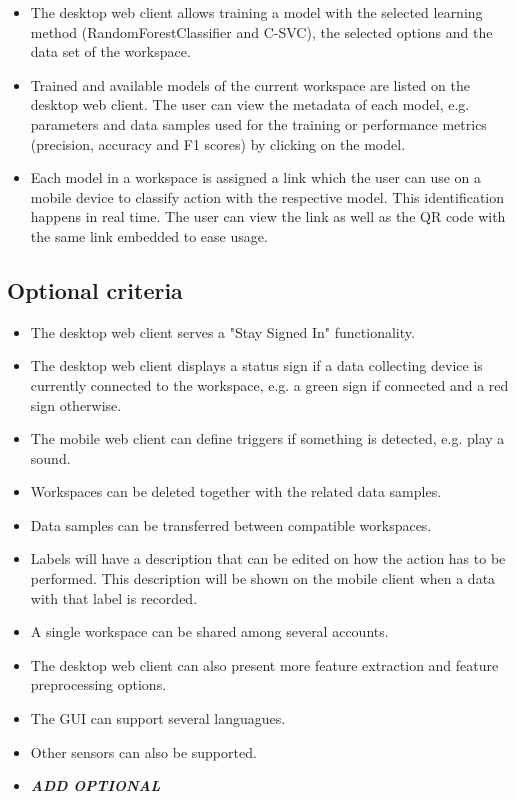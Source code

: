 \begin{itemize}
    \item The desktop web client allows training a model with the selected learning method (RandomForestClassifier and C-SVC), the selected options and the data set of the workspace.
    \item Trained and available models of the current workspace are listed on the desktop web client. The user can view the metadata of each model, e.g. parameters and data samples used for the training or performance metrics (precision, accuracy and F1 scores) by clicking on the model.
    \item Each model in a workspace is assigned a link which the user can use on a mobile device to classify action with the respective model. This identification happens in real time. The user can view the link as well as the QR code with the same link embedded to ease usage.
\end{itemize}

\subsection{Optional criteria}
\begin{itemize}
    \item The desktop web client serves a "Stay Signed In" functionality.
    \item The desktop web client displays a status sign if a data collecting device is currently connected to the workspace, e.g. a green sign if connected and a red sign otherwise.
    \item The mobile web client can define triggers if something is detected, e.g. play a sound.
    \item Workspaces can be deleted together with the related data samples.
    \item Data samples can be transferred between compatible workspaces.
    \item Labels will have a description that can be edited on how the action has to be performed. This description will be shown on the mobile client when a data with that label is recorded.
    \item A single workspace can be shared among several accounts.
    \item The desktop web client can also present more feature extraction and feature preprocessing options.
    \item The GUI can support several languagues.
    \item Other sensors can also be supported.
    \item \textbf{\emph{ADD OPTIONAL}}
\end{itemize}

